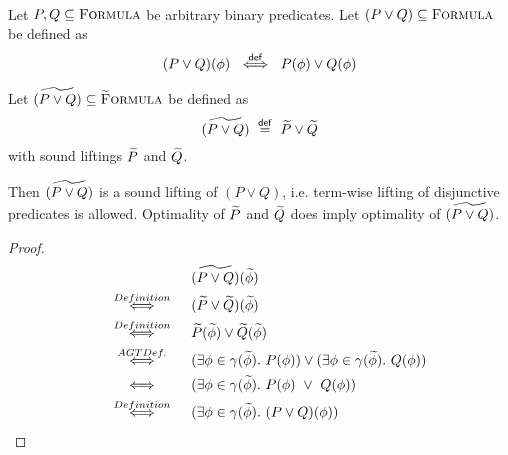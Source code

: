\begin{lemma}~\\
    Let $P, Q \subseteq \textup{\textsc{Formula}}$ be arbitrary binary predicates.
    Let $(P \vee Q) \subseteq \textup{\textsc{Formula}}$ be defined as
    \begin{displaymath}
    (P \vee Q)(\phi) ~\overset{\textup{\textmd{\textsf{def}}}}{\iff}~ P(\phi) \vee Q(\phi)
    \end{displaymath}
    
    Let $\widetilde{(P \vee Q)} \subseteq \textup{\textsc{\ensuremath{\widetilde{\text{F}}}ormula}}$ be defined as
    \begin{displaymath}
    \widetilde{(P \vee Q)} ~\overset{\textup{\textmd{\textsf{def}}}}{=}~ \widetilde{P} \vee \widetilde{Q}
    \end{displaymath}
    with sound liftings $\widetilde{P}$ and $\widetilde{Q}$.
    
    Then $\widetilde{(P \vee Q)}$ is a sound lifting of $(P \vee Q)$, i.e. term-wise lifting of disjunctive predicates is allowed.
    Optimality of $\widetilde{P}$ and $\widetilde{Q}$ does imply optimality of $\widetilde{(P \vee Q)}$.
\end{lemma}
\begin{proof}
    \begin{align*}
    &\widetilde{(P \vee Q)}(\widetilde{\phi})\\
    \overset{Definition}{~\quad\quad\iff\quad\quad~}
    &(\widetilde{P} \vee \widetilde{Q})(\widetilde{\phi})\\
    \overset{Definition}{~\quad\quad\iff\quad\quad~}
    &\widetilde{P}(\widetilde{\phi}) \vee \widetilde{Q}(\widetilde{\phi})\\
    \overset{AGT Def.}{~\quad\quad\iff\quad\quad~}
    &(\exists \phi \in \gamma(\widetilde{\phi}).~ P(\phi)) \vee (\exists \phi \in \gamma(\widetilde{\phi}).~ Q(\phi))\\
    \overset{}{~\quad\quad\iff\quad\quad~}
    &(\exists \phi \in \gamma(\widetilde{\phi}).~ P(\phi) ~\vee~ Q(\phi))\\
    \overset{Definition}{~\quad\quad\iff\quad\quad~}
    &(\exists \phi \in \gamma(\widetilde{\phi}).~ (P \vee Q)(\phi))
    \end{align*}
\end{proof}

\begin{comment}
We define $\setGFormulaA = \{~ \grad{\phi} \in \setGFormula ~|~ \exists \pi.~ \evalgphiGen {\pi} {\grad{\phi}} ~\}$ as the set of satisfiable gradual formulas.

\begin{lemma}[Restricted Domain of Concretization]~\\
    $\restr{\gamma}{\setGFormulaA}$ never returns the empty set.
\end{lemma}

\end{comment}

